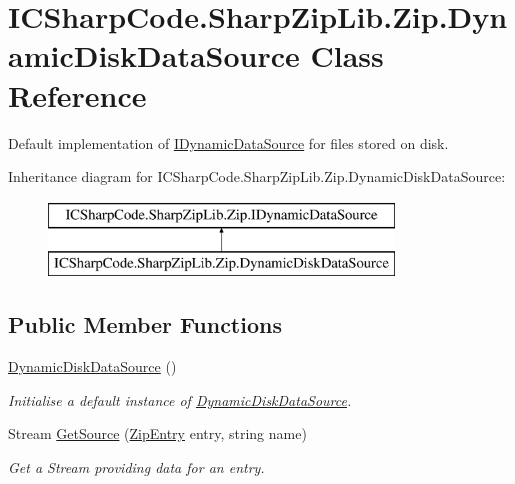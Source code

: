 \hypertarget{class_i_c_sharp_code_1_1_sharp_zip_lib_1_1_zip_1_1_dynamic_disk_data_source}{}\section{I\+C\+Sharp\+Code.\+Sharp\+Zip\+Lib.\+Zip.\+Dynamic\+Disk\+Data\+Source Class Reference}
\label{class_i_c_sharp_code_1_1_sharp_zip_lib_1_1_zip_1_1_dynamic_disk_data_source}


Default implementation of \hyperlink{interface_i_c_sharp_code_1_1_sharp_zip_lib_1_1_zip_1_1_i_dynamic_data_source}{I\+Dynamic\+Data\+Source} for files stored on disk.  


Inheritance diagram for I\+C\+Sharp\+Code.\+Sharp\+Zip\+Lib.\+Zip.\+Dynamic\+Disk\+Data\+Source\+:\begin{figure}[H]
\begin{center}
\leavevmode
\includegraphics[height=2.000000cm]{class_i_c_sharp_code_1_1_sharp_zip_lib_1_1_zip_1_1_dynamic_disk_data_source}
\end{center}
\end{figure}
\subsection*{Public Member Functions}
\begin{DoxyCompactItemize}
\item 
\hyperlink{class_i_c_sharp_code_1_1_sharp_zip_lib_1_1_zip_1_1_dynamic_disk_data_source_a4f00461c6ce860f013150224f72f8842}{Dynamic\+Disk\+Data\+Source} ()
\begin{DoxyCompactList}\small\item\em Initialise a default instance of \hyperlink{class_i_c_sharp_code_1_1_sharp_zip_lib_1_1_zip_1_1_dynamic_disk_data_source}{Dynamic\+Disk\+Data\+Source}. \end{DoxyCompactList}\item 
Stream \hyperlink{class_i_c_sharp_code_1_1_sharp_zip_lib_1_1_zip_1_1_dynamic_disk_data_source_a565488e7729b6a2fe3fd03fad5a9c03e}{Get\+Source} (\hyperlink{class_i_c_sharp_code_1_1_sharp_zip_lib_1_1_zip_1_1_zip_entry}{Zip\+Entry} entry, string name)
\begin{DoxyCompactList}\small\item\em Get a Stream providing data for an entry. \end{DoxyCompactList}\end{DoxyCompactItemize}


